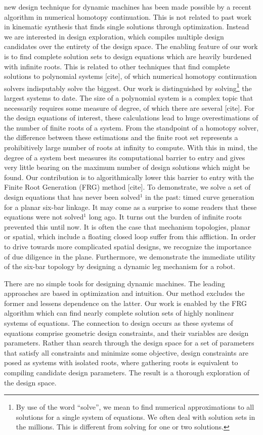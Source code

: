 \documentclass[journal]{IEEEtran}
\begin{document}
 new design technique for dynamic machines has been made possible by a recent algorithm in numerical homotopy continuation.  This is not related to past work in kinematic synthesis that finds single solutions through optimization.  Instead we are interested in design exploration, which compiles multiple design candidates over the entirety of the design space.  The enabling feature of our work is to find complete solution sets to design equations which are heavily burdened with infinite roots.  This is related to other techniques that find complete solutions to polynomial systems [cite], of which numerical homotopy continuation solvers indisputably solve the biggest.  Our work is distinguished by solving\footnote{By use of the word ``solve'', we mean to find numerical approximations to all solutions for a single system of equations.  We often deal with solution sets in the millions.  This is different from solving for one or two solutions.} the largest systems to date.  The size of a polynomial system is a complex topic that necessarily requires some measure of degree, of which there are several [cite].  For the design equations of interest, these calculations lead to huge overestimations of the number of finite roots of a system.  From the standpoint of a homotopy solver, the difference between these estimations and the finite root set represents a prohibitively large number of roots at infinity to compute.  With this in mind, the degree of a system best measures its computational barrier to entry and gives very little bearing on the maximum number of design solutions which might be found.  Our contribution is to algorithmically lower this barrier to entry with the Finite Root Generation (FRG) method [cite].  To demonstrate, we solve a set of design equations that has never been solved$^1$ in the past: timed curve generation for a planar six-bar linkage.  It may come as a surprise to some readers that these equations were not solved$^1$ long ago.  It turns out the burden of infinite roots prevented this until now.  It is often the case that mechanism topologies, planar or spatial, which include a floating closed loop suffer from this affliction.  In order to drive towards more complicated spatial designs, we recognize the importance of due diligence in the plane.  Furthermore, we demonstrate the immediate utility of the six-bar topology by designing a dynamic leg mechanism for a robot.

There are no simple tools for designing dynamic machines.
The leading approaches are based in optimization and intuition.
Our method excludes the former and lessens dependence on the latter.
Our work is enabled by the FRG algorithm which can find nearly complete solution sets of highly nonlinear systems of equations.
%
The connection to design occurs as these systems of equations comprise geometric design constraints, and their variables are design parameters.
Rather than search through the design space for a set of parameters that satisfy all constraints and minimize some objective, design constraints are posed as systems with isolated roots, where gathering roots is equivalent to compiling candidate design parameters.  The result is a thorough exploration of the design space.
\end{document}

